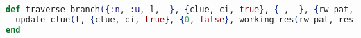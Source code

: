 \begin{lstlisting}[language=Elixir, caption=Edge case ignoring the right branch]
def traverse_branch({:n, :u, l, _}, {clue, ci, true}, {_, _}, {rw_pat, res, _}, stack) do
  update_clue(l, {clue, ci, true}, {0, false}, working_res(rw_pat, res), stack)
end
\end{lstlisting}